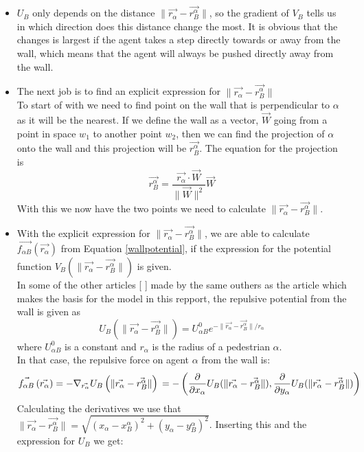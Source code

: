 \begin{itemize}
\item  $U_B$ only depends on the distance $ \| \vec{r_{\alpha}} - \vec{r_{B}^{\alpha}} \|$, so the gradient of $V_B$ tells us in which direction does this distance change the most. It is obvious that the changes is largest if the agent takes a step directly towards or away from the wall, which means that the agent will always be pushed directly away from the wall.

\item The next job is to find an explicit expression for $ \| \vec{r_{\alpha}} - \vec{r_{B}^{\alpha}} \|$\\
To start of with we need to find point on the wall that is perpendicular to $\alpha$ as it will be the nearest.  
If we define the wall as a vector, $\vec{W}$ going from a point in space $w_1$ to another point $w_2$, then we can find the projection of $\alpha$ onto the wall and this projection will be $\vec{r_{B}^{\alpha}}$.
The equation for the projection is
\begin{equation}\label{wall}
\vec{r_{B}^{\alpha}}=\frac{\vec{r_{\alpha}}\cdot \vec{W}}{\| \vec{W} \|^2}\vec{W}
\end{equation}
With this we now have the two points we need to calculate $ \| \vec{r_{\alpha}} - \vec{r_{B}^{\alpha}} \|$.


\item With the explicit expression for $ \| \vec{r_{\alpha}} - \vec{r_{B}^{\alpha}} \| $, we are able to calculate $ \vec{f_{\alpha B}} \left( \vec{r_{\alpha}} \right) $ from Equation \ref{wallpotential}, if the expression for the potential function $ V_{B}
    \left( \| \vec{r_{\alpha}} - \vec{r_{B}^{\alpha}} \| \right) $ is given.\\
In some of the other articles [ ] made by the same outhers as the article which makes the basis for the model in this repport, the repulsive potential from the wall is given as
\begin{equation}
U_{B} \left( \| \vec{r_{\alpha}} - \vec{r_{B}^{\alpha}} \| \right) =
U^0_{\alpha B} e^{- \| \vec{r_{\alpha}} - \vec{r_{B}^{\alpha}} \| / r_{\alpha} }
\end{equation}
where $U^0_{\alpha B}$ is a constant and $r_{\alpha}$ is the radius of a pedestrian $\alpha$. \\

In that case, the repulsive force on agent $ \alpha $ from the wall is:
\begin{equation}
    \vec{f_{\alpha B}} \left( \vec{r_{\alpha}} \right) =
    - \nabla_{\vec{r_{\alpha}}} U_{B}
    \left( \| \vec{r_{\alpha}} - \vec{r_{B}^{\alpha}} \| \right)\\
=-\left( \frac{\partial}{\partial x_{\alpha}}U_{B}( \| \vec{r_{\alpha}} - \vec{r_{B}^{\alpha}} \|), \frac{\partial}{\partial y_{\alpha}}U_{B}( \| \vec{r_{\alpha}} - \vec{r_{B}^{\alpha}} \|)\right) \\
\end{equation}
Calculating the derivatives we use that $\| \vec{r_{\alpha}} - \vec{r_{B}^{\alpha}} \|= \sqrt{(x_{\alpha}-x^{\alpha}_{B})^2+(y_{\alpha}-y^{\alpha}_B)^2}$.
Inserting this and the expression for $U_{B}$ we get:


\end{itemize}
